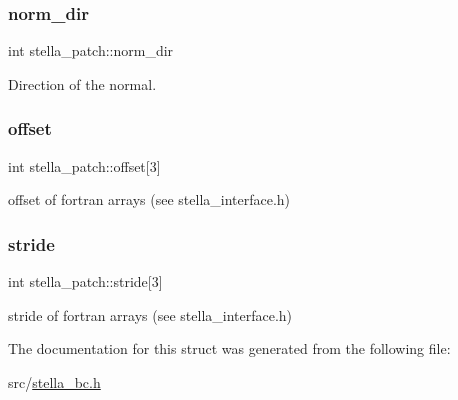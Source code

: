 \subsubsection{\texorpdfstring{norm\+\_\+dir}{norm\_dir}}
{\footnotesize\ttfamily int stella\+\_\+patch\+::norm\+\_\+dir}



Direction of the normal. 

\mbox{\label{structstella__patch_aa339447fec0da1774027d1b07389c14a}} 
\subsubsection{\texorpdfstring{offset}{offset}}
{\footnotesize\ttfamily int stella\+\_\+patch\+::offset\mbox{[}3\mbox{]}}



offset of fortran arrays (see stella\+\_\+interface.\+h) 

\mbox{\label{structstella__patch_ad5006aeed0381182eeb4ffd041c8332c}} 
\subsubsection{\texorpdfstring{stride}{stride}}
{\footnotesize\ttfamily int stella\+\_\+patch\+::stride\mbox{[}3\mbox{]}}



stride of fortran arrays (see stella\+\_\+interface.\+h) 



The documentation for this struct was generated from the following file\+:\begin{DoxyCompactItemize}
\item 
src/\mbox{\hyperlink{stella__bc_8h}{stella\+\_\+bc.\+h}}\end{DoxyCompactItemize}
